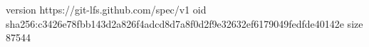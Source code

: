 version https://git-lfs.github.com/spec/v1
oid sha256:c3426e78fbb143d2a826f4adcd8d7a8f0d2f9e32632ef6179049fedfde40142e
size 87544
